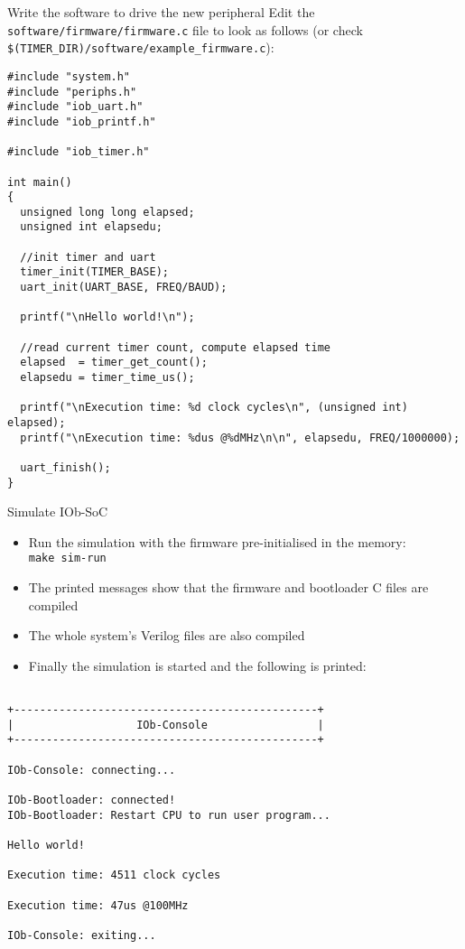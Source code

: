 \documentclass [xcolor=svgnames, t] {beamer}
\begin{document}
\begin{frame}[fragile]{Write the software to drive the new peripheral}
    Edit the {\tt software/firmware/firmware.c} file to look as follows (or check
    {\tt \$(TIMER\_DIR)/software/example\_firmware.c}):
  \begin{tiny}
    \begin{lstlisting}
#include "system.h"
#include "periphs.h"
#include "iob_uart.h"
#include "iob_printf.h"

#include "iob_timer.h"

int main()
{
  unsigned long long elapsed;
  unsigned int elapsedu;

  //init timer and uart
  timer_init(TIMER_BASE);
  uart_init(UART_BASE, FREQ/BAUD);

  printf("\nHello world!\n");

  //read current timer count, compute elapsed time
  elapsed  = timer_get_count();
  elapsedu = timer_time_us();

  printf("\nExecution time: %d clock cycles\n", (unsigned int) elapsed);
  printf("\nExecution time: %dus @%dMHz\n\n", elapsedu, FREQ/1000000);

  uart_finish();
}
    \end{lstlisting}
  \end{tiny}
\end{frame}


\begin{frame}[fragile]{Simulate IOb-SoC}
\begin{itemize}
\item Run the simulation with the firmware pre-initialised in the memory:\\
  {\tt make sim-run}
\item The printed messages show that the firmware and bootloader C files are compiled
\item The whole system's Verilog files are also compiled
\item Finally the simulation is started and the following is printed:
\end{itemize}

\begin{tiny}
  \begin{lstlisting}

+-----------------------------------------------+
|                   IOb-Console                 |
+-----------------------------------------------+

IOb-Console: connecting...

IOb-Bootloader: connected!
IOb-Bootloader: Restart CPU to run user program...

Hello world!

Execution time: 4511 clock cycles

Execution time: 47us @100MHz

IOb-Console: exiting...

  \end{lstlisting}
\end{tiny}
\end{frame}
\end{document}
